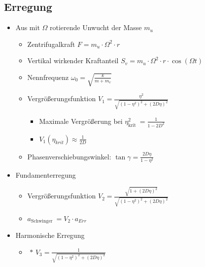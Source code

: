 \documentclass[fleqn,twoside]{article}
\begin{document}
\begin{multicols*}{3}
\subsection{Erregung}
\begin{itemize}
    \item Aus mit $\Omega$ rotierende Unwucht der Masse $m_u$
        \begin{itemize}
            \item Zentrifugalkraft $F=m_u \cdot \Omega^2 \cdot r$
            \item Vertikal wirkender Kraftanteil $S_v=m_u \cdot \Omega^2 \cdot r \cdot \cos (\Omega t)$
            \item Nennfrequenz $\omega_0=\sqrt{\frac{k}{m+m_v}}$
            \item Vergrößerungsfunktion $V_1=\frac{\eta^2}{\sqrt{\left(1-\eta^2\right)^2+(2 D \eta)^2}}$
            \begin{itemize}
                \item Maximale Vergrößerung bei $\eta_{\text {krit }}^2=\frac{1}{1-2 D^2}$
                \item $V_1\left(\eta_{k r i t}\right) \approx \frac{1}{2 D}$
            \end{itemize}
            \item Phasenverschiebungswinkel: $\tan \gamma=\frac{2 D \eta}{1-\eta^2}$
        \end{itemize}
    \item Fundamenterregung
        \begin{itemize}
            \item Vergrößerungsfunktion $V_2=\frac{\sqrt{1+(2 D \eta)^2}}{\sqrt{\left(1-\eta^2\right)^2+(2 D \eta)^2}}$
            \item $a_{\text {Schwinger }}=V_2 \cdot a_{E r r}$
        \end{itemize}
    \item Harmonische Erregung
        \begin{itemize}
            \item $\text { * } V_3=\frac{1}{\sqrt{\left(1-\eta^2\right)^2+(2 D \eta)^2}}$
        \end{itemize}
\end{itemize}


\end{multicols*}
\end{document}
